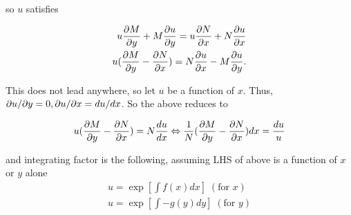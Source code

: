 so $u$ satisfies

\begin{eqnarray}
    u\frac{\partial M}{\partial y}+M\frac{\partial u}{\partial y}=u\frac{\partial N}{\partial x}+N\frac{\partial u}{\partial x}\\
    u(\frac{\partial M}{\partial y}-\frac{\partial N}{\partial x})=N\frac{\partial u}{\partial x}-M\frac{\partial u}{\partial y}.
\end{eqnarray}

This does not lead anywhere, so let $u$ be a function of $x$. Thus, $\partial u/\partial y=0,\partial u/\partial x=du/dx$.
So the above reduces to

\begin{equation*}
    u(\frac{\partial M}{\partial y}-\frac{\partial N}{\partial x})=N\frac{du}{dx}\Leftrightarrow \frac{1}{N}(\frac{\partial M}{\partial y}-\frac{\partial N}{\partial x})dx=\frac{du}{u}
\end{equation*}

and integrating factor is the following, assuming LHS of above is a function of $x$ or $y$ alone
\begin{eqnarray}
    u=\exp\left[\int f(x)dx\right]\;(\text{for $x$})\\
    u=\exp\left[\int -g(y)dy\right]\;(\text{for $y$})
\end{eqnarray}